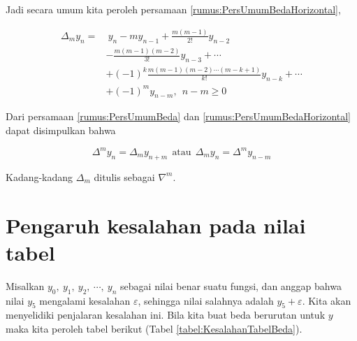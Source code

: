 Jadi secara umum kita peroleh persamaan \ref{rumus:PersUmumBedaHorizontal},

\begin{equation} \label{rumus:PersUmumBedaHorizontal}
\begin{split}
\Delta_m y_n = &~ y_{n} - m y_{n-1} + \frac{m(m-1)}{2!}y_{n-2} \\
		& - \frac{m(m-1)(m-2)}{3!}y_{n-3} + \cdots \\
		& + (-1)^k \frac{m(m-1)(m-2) \cdots (m-k+1)}{k!}y_{n-k} + \cdots \\
		& + (-1)^m y_{n-m},~~n-m \geq 0
\end{split}
\end{equation}

Dari persamaan \ref{rumus:PersUmumBeda} dan \ref{rumus:PersUmumBedaHorizontal} dapat disimpulkan bahwa

\begin{equation}
\Delta^m y_n = \Delta_m y_{n+m} ~~\text{atau}~~ \Delta_m y_n = \Delta^m y_{n-m}
\end{equation}

Kadang-kadang $\Delta_m$ ditulis sebagai $\nabla^m$.

\section{Pengaruh kesalahan pada nilai tabel}
Misalkan $y_0,~y_1,~y_2,~\cdots,~y_n$ sebagai nilai benar suatu fungsi, dan anggap bahwa nilai $y_5$ mengalami kesalahan $\varepsilon$, sehingga nilai salahnya adalah $y_5 + \varepsilon$. Kita akan menyelidiki penjalaran kesalahan ini. Bila kita buat beda berurutan untuk $y$ maka kita peroleh tabel berikut (Tabel \ref{tabel:KesalahanTabelBeda}).

